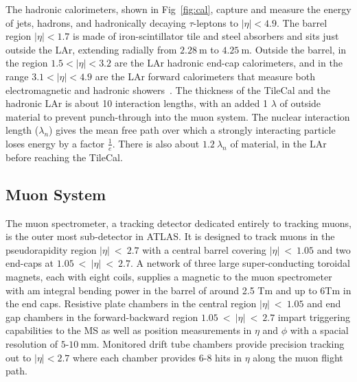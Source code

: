 The hadronic calorimeters, shown in Fig~\ref{fig:cal}, capture and measure the energy of jets, hadrons, and hadronically decaying $\tau$-leptons to $|\eta|<4.9$.  The barrel region $|\eta| < 1.7$ is made of iron-scintillator tile and steel absorbers and sits just outside the LAr, extending radially from $2.28~\mathrm{m}$ to $4.25~\mathrm{m}$.  Outside the barrel, in the region $1.5<|\eta|<3.2$ are the LAr hadronic end-cap calorimeters, and in the range $3.1<|\eta|<4.9$ are the LAr forward calorimeters that measure both electromagnetic and hadronic showers~\cite{henriqu:tile}.  The thickness of the TileCal and the hadronic LAr is about 10 interaction lengths, with an added 1 $\lambda$ of outside material to prevent punch-through into the muon system.  The nuclear interaction length ($\lambda_n$) gives the mean free path over which a strongly interacting particle loses energy by a factor $\frac{1}{e}$.  There is also about $1.2~\lambda_n$ of material, in the LAr before reaching the TileCal.   
\subsection{Muon System}
The muon spectrometer, a tracking detector dedicated entirely to tracking muons, is the outer most sub-detector in ATLAS.  It is designed to track muons in the pseudorapidity region $|\eta|~<~2.7$ with a central barrel covering $|\eta|~<~1.05$ and two end-caps at $1.05~<~|\eta|~<~2.7$.  A network of three large super-conducting toroidal magnets, each with eight coils, supplies a magnetic to the muon spectrometer with am integral bending power in the barrel of around 2.5 Tm and up to 6Tm in the end caps.  Resistive plate chambers in the central region $|\eta|~<~1.05$ and end gap chambers in the forward-backward region $1.05~<~|\eta|~<~2.7$ impart triggering capabilities to the MS as well as position measurements in $\eta$ and $\phi$ with a spacial resolution of $5$-$10~\mathrm{mm}$. Monitored drift tube chambers provide precision tracking out to $|\eta| < 2.7$ where each chamber provides $6$-$8$ hits in $\eta$ along the muon flight path.  %

